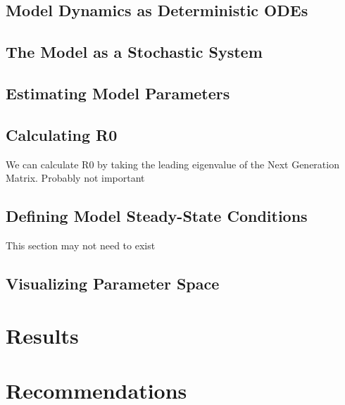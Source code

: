 \documentclass[11pt, a4paper]{article}
\begin{document}
  \subsection{Model Dynamics as Deterministic ODEs}
  
  \subsection{The Model as a Stochastic System}
  
  \subsection{Estimating Model Parameters}
  
  \subsection{Calculating R0}
  We can calculate R0 by taking the leading eigenvalue of the Next Generation Matrix.
  Probably not important
  \clearpage
  \subsection{Defining Model Steady-State Conditions}
  This section may not need to exist
  \clearpage
  \subsection{Visualizing Parameter Space}
  
\section{Results}

\section{Recommendations}

{}

\end{document}

